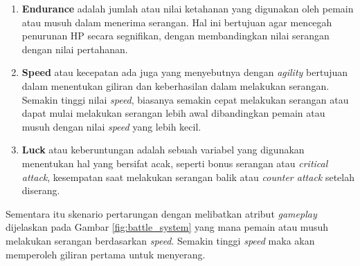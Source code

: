 \begin{enumerate}[label=\textbf{\arabic*).}]
\begin{enumerate}[label=\alph*).]
		\item \textbf{Endurance} adalah jumlah atau nilai ketahanan yang digunakan oleh pemain atau musuh dalam menerima serangan. Hal ini bertujuan agar mencegah penurunan HP secara segnifikan, dengan membandingkan nilai serangan dengan nilai pertahanan.
		
		\item \textbf{Speed} atau kecepatan ada juga yang menyebutnya dengan \textit{agility} bertujuan dalam menentukan giliran dan keberhasilan dalam melakukan serangan. Semakin tinggi nilai \textit{speed}, biasanya semakin cepat melakukan serangan atau dapat mulai melakukan serangan lebih awal dibandingkan pemain atau musuh dengan nilai \textit{speed} yang lebih kecil.
		
		\item \textbf{Luck} atau keberuntungan adalah sebuah variabel yang digunakan menentukan hal yang bersifat acak, seperti bonus serangan atau \textit{critical attack}, kesempatan saat melakukan serangan balik atau \textit{counter attack} setelah diserang.
	\end{enumerate}
	
	Sementara itu skenario pertarungan dengan melibatkan atribut \textit{gameplay} dijelaskan pada Gambar \ref{fig:battle_system} yang mana pemain atau musuh melakukan serangan berdasarkan \textit{speed}. Semakin tinggi \textit{speed} maka akan memperoleh giliran pertama untuk menyerang.
	\vspace{1ex}
	

\end{enumerate}
